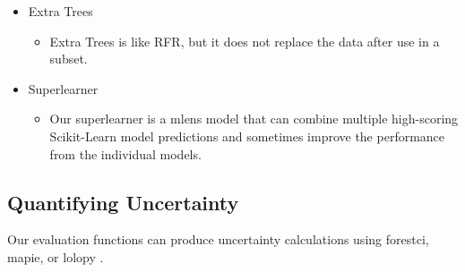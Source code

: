 \documentclass[twocolumn, nofootinbib, secnumarabic, amssymb, nobibnotes, aps, prd]{revtex4-2}
\begin{document}
\begin{itemize}
  \item Extra Trees
  \begin{itemize}
  		\item Extra Trees is like RFR, but it does not replace the data after use in a subset.
  \end{itemize}
  \item Superlearner
  \begin{itemize}
  		\item Our superlearner is a mlens model that can combine multiple high-scoring Scikit-Learn model predictions and sometimes improve the performance from the individual models.
  \end{itemize}
\end{itemize}\label{itm:models}




\subsection{Quantifying Uncertainty}\label{sec:uncertainty}
Our evaluation functions can produce uncertainty calculations using forestci, mapie, or lolopy \cite{Polimis2017, Taquet2022, Hutchinson2022}. 
\end{document}
